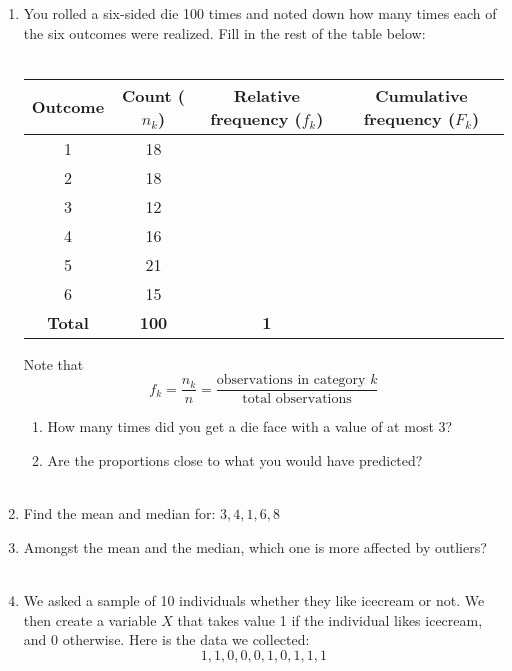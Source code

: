 \documentclass{./../handout}
\begin{document}
\thispagestyle{plain}
\begin{center}
\end{center}	

\begin{enumerate}
\item You rolled a six-sided die 100 times and noted down how many times each of the six outcomes were realized. Fill in the rest of the table below: \\~\\
\begin{tabular}{c|c|c|c}
Outcome & Count ($n_k$) & Relative frequency ($f_k$) & Cumulative frequency ($F_k$) \\
\hline
1 &  18 & & \\
\hline
2 & 18 & & \\
\hline
3 & 12 & & \\
\hline
4 & 16 & & \\
\hline
5 & 21 & & \\
\hline
6 & 15 & & \\
\hline
\textbf{Total} & \textbf{100} & \textbf{1} & \\
\hline
\end{tabular}
\vspace{0.5em}

Note that $$ f_k = \frac{n_k}{n} = \frac{\text{observations in category $k$}}{\text{total observations}} $$

\begin{enumerate}
	\item How many times did you get a die face with a value of at most 3? \\ 
	\item Are the proportions close to what you would have predicted? \\~\\
\end{enumerate}

\item Find the mean and median for: $ 3, 4, 1, 6, 8 $
\vspace{5em}
\item Amongst the mean and the median, which one is more affected by outliers? \\~\\
\item We asked a sample of 10 individuals whether they like icecream or not. We then create a variable $X$ that takes value 1 if the individual likes icecream, and 0 otherwise.  Here is the data we collected:
$$ 1, 1, 0, 0, 0, 1, 0, 1, 1, 1 $$


\end{enumerate}
\end{document}
